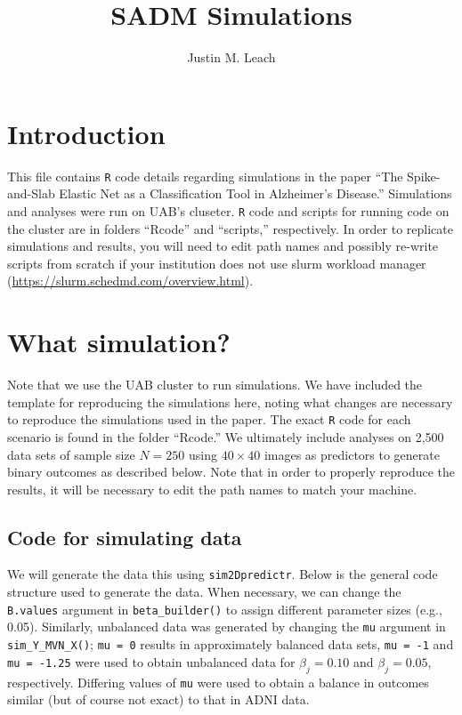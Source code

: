 \documentclass[
]{article}
\title{SADM Simulations}
\author{Justin M. Leach}
\date{}
\begin{document}
\maketitle

\hypertarget{introduction}{%
\section{Introduction}\label{introduction}}

This file contains \texttt{R} code details regarding simulations in the
paper ``The Spike-and-Slab Elastic Net as a Classification Tool in
Alzheimer's Disease.'' Simulations and analyses were run on UAB's
cluseter. \texttt{R} code and scripts for running code on the cluster
are in folders ``Rcode'' and ``scripts,'' respectively. In order to
replicate simulations and results, you will need to edit path names and
possibly re-write scripts from scratch if your institution does not use
slurm workload manager (\url{https://slurm.schedmd.com/overview.html}).

\hypertarget{what-simulation}{%
\section{What simulation?}\label{what-simulation}}

Note that we use the UAB cluster to run simulations. We have included
the template for reproducing the simulations here, noting what changes
are necessary to reproduce the simulations used in the paper. The exact
\texttt{R} code for each scenario is found in the folder ``Rcode.'' We
ultimately include analyses on 2,500 data sets of sample size
\(N = 250\) using \(40 \times 40\) images as predictors to generate
binary outcomes as described below. Note that in order to properly
reproduce the results, it will be necessary to edit the path names to
match your machine.

\hypertarget{code-for-simulating-data}{%
\subsection{Code for simulating data}\label{code-for-simulating-data}}

We will generate the data this using \texttt{sim2Dpredictr}. Below is
the general code structure used to generate the data. When necessary, we
can change the \texttt{B.values} argument in \texttt{beta\_builder()} to
assign different parameter sizes (e.g., 0.05). Similarly, unbalanced
data was generated by changing the \texttt{mu} argument in
\texttt{sim\_Y\_MVN\_X()}; \texttt{mu\ =\ 0} results in approximately
balanced data sets, \texttt{mu\ =\ -1} and \texttt{mu\ =\ -1.25} were
used to obtain unbalanced data for \(\beta_j = 0.10\) and
\(\beta_j = 0.05\), respectively. Differing values of \texttt{mu} were
used to obtain a balance in outcomes similar (but of course not exact)
to that in ADNI data.
\end{document}
